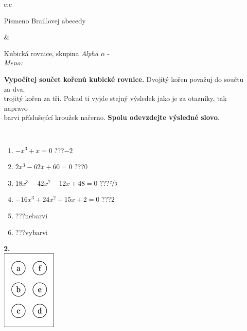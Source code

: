 \documentclass[10pt]{report}
\begin{document}
\begin{tabular}{c:c}
\begin{minipage}[c][104.5mm][t]{0.5\linewidth}
\begin{center}
\begin{minipage}{0.20\linewidth}
\begin{center}
{\small Písmeno Braillovej abecedy}
\end{center}
\end{minipage}
\end{center}
\end{minipage}
&
\begin{minipage}[c][104.5mm][t]{0.5\linewidth}
\begin{center}
\vspace{7mm}
{\huge Kubická rovnice, skupina \textit{Alpha $\alpha$} -}\\[5mm]
\textit{Meno:}\phantom{xxxxxxxxxxxxxxxxxxxxxxxxxxxxxxxxxxxxxxxxxxxxxxxxxxxxxxxxxxxxxxxxx}\\[5mm]
\begin{minipage}{0.95\linewidth}
\textbf{Vypočítej součet kořenů kubické rovnice.} Dvojitý kořen považuj do součtu za dva,\\trojitý kořen za tři. Pokud ti vyjde stejný výsledek jako je za otazníky, tak napravo\\barvi příslušející kroužek načerno. \textbf{Spolu odevzdejte výsledné slovo}.
\end{minipage}
\\[1mm]
\begin{minipage}{0.79\linewidth}
\begin{center}
\begin{varwidth}{\linewidth}
\begin{enumerate}
\Large
\item $-x^3+x=0$\quad \dotfill\; ???\;\dotfill \quad $-2$
\item $2x^3-62x+60=0$\quad \dotfill\; ???\;\dotfill \quad $0$
\item $18x^3-42x^2-12x+48=0$\quad \dotfill\; ???\;\dotfill \quad $\nicefrac{7}{3}$
\item $-16x^3+24x^2+15x+2=0$\quad \dotfill\; ???\;\dotfill \quad $2$
\item \quad \dotfill\; ???\;\dotfill \quad nebarvi
\item \quad \dotfill\; ???\;\dotfill \quad vybarvi
\end{enumerate}
\end{varwidth}
\end{center}
\end{minipage}
\begin{minipage}{0.20\linewidth}
\begin{center}
{\Huge\bfseries 2.} \\[2mm]
\includegraphics[height=40mm]{../images/braille.png}

\end{center}
\end{minipage}
\end{center}
\end{minipage}
\end{tabular}
\end{document}
